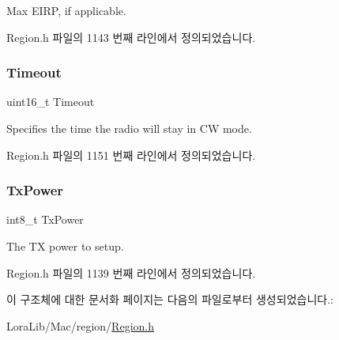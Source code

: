 Max E\+I\+RP, if applicable. 

Region.\+h 파일의 1143 번째 라인에서 정의되었습니다.

\mbox{\label{structs_continuous_wave_params_ae1c58f120c7eef7bb71a5e3bfeaeb795}} 
\subsubsection{\texorpdfstring{Timeout}{Timeout}}
{\footnotesize\ttfamily uint16\+\_\+t Timeout}

Specifies the time the radio will stay in CW mode. 

Region.\+h 파일의 1151 번째 라인에서 정의되었습니다.

\mbox{\label{structs_continuous_wave_params_a037b4f849fa8ed4aa1d3c58aef2b28ec}} 
\subsubsection{\texorpdfstring{Tx\+Power}{TxPower}}
{\footnotesize\ttfamily int8\+\_\+t Tx\+Power}

The TX power to setup. 

Region.\+h 파일의 1139 번째 라인에서 정의되었습니다.



이 구조체에 대한 문서화 페이지는 다음의 파일로부터 생성되었습니다.\+:\begin{DoxyCompactItemize}
\item 
Lora\+Lib/\+Mac/region/\mbox{\hyperlink{_region_8h}{Region.\+h}}\end{DoxyCompactItemize}

